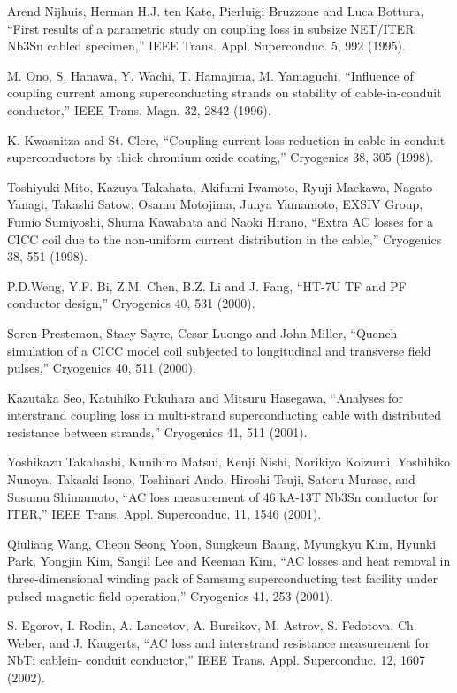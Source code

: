 \noindent [6.37] Arend Nijhuis, Herman H.J. ten Kate, Pierluigi Bruzzone and Luca Bottura, ``First results of a parametric study on coupling loss in subsize NET/ITER Nb3Sn cabled specimen,” IEEE Trans. Appl. Superconduc. 5, 992 (1995).

\noindent [6.38] M. Ono, S. Hanawa, Y. Wachi, T. Hamajima, M. Yamaguchi, ``Influence of coupling current among superconducting strands on stability of cable-in-conduit conductor,” IEEE Trans. Magn. 32, 2842 (1996).

\noindent [6.39] K. Kwasnitza and St. Clerc, ``Coupling current loss reduction in cable-in-conduit
superconductors by thick chromium oxide coating,” Cryogenics 38, 305 (1998).

\noindent [6.40] Toshiyuki Mito, Kazuya Takahata, Akifumi Iwamoto, Ryuji Maekawa, Nagato
Yanagi, Takashi Satow, Osamu Motojima, Junya Yamamoto, EXSIV Group, Fumio
Sumiyoshi, Shuma Kawabata and Naoki Hirano, ``Extra AC losses for a CICC coil due to the non-uniform current distribution in the cable,” Cryogenics 38, 551 (1998).

\noindent [6.41] P.D.Weng, Y.F. Bi, Z.M. Chen, B.Z. Li and J. Fang, ``HT-7U TF and PF conductor
design,” Cryogenics 40, 531 (2000).

\noindent [6.42] Soren Prestemon, Stacy Sayre, Cesar Luongo and John Miller, ``Quench simulation of a CICC model coil subjected to longitudinal and transverse field pulses,”
Cryogenics 40, 511 (2000).

\noindent [6.43] Kazutaka Seo, Katuhiko Fukuhara and Mitsuru Hasegawa, ``Analyses for interstrand coupling loss in multi-strand superconducting cable with distributed resistance between strands,” Cryogenics 41, 511 (2001).

\noindent [6.44] Yoshikazu Takahashi, Kunihiro Matsui, Kenji Nishi, Norikiyo Koizumi, Yoshihiko Nunoya, Takaaki Isono, Toshinari Ando, Hiroshi Tsuji, Satoru Murase, and Susumu Shimamoto, ``AC loss measurement of 46 kA-13T Nb3Sn conductor for ITER,”
IEEE Trans. Appl. Superconduc. 11, 1546 (2001).

\noindent [6.45] Qiuliang Wang, Cheon Seong Yoon, Sungkeun Baang, Myungkyu Kim, Hyunki
Park, Yongjin Kim, Sangil Lee and Keeman Kim, ``AC losses and heat removal
in three-dimensional winding pack of Samsung superconducting test facility under
pulsed magnetic field operation,” Cryogenics 41, 253 (2001).

\noindent [6.46] S. Egorov, I. Rodin, A. Lancetov, A. Bursikov, M. Astrov, S. Fedotova, Ch. Weber,
and J. Kaugerts, ``AC loss and interstrand resistance measurement for NbTi cablein-
conduit conductor,” IEEE Trans. Appl. Superconduc. 12, 1607 (2002).

